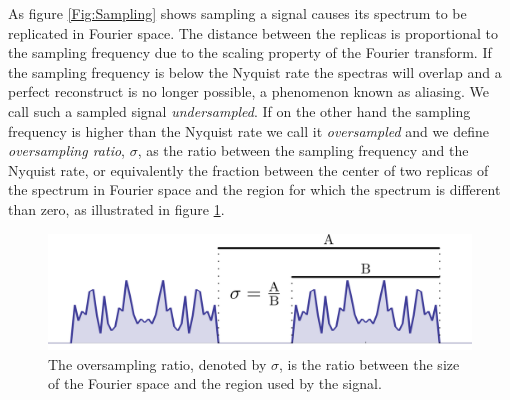 As figure \ref{Fig:Sampling} shows sampling a signal causes its spectrum to be
replicated in Fourier space. The distance between the replicas is proportional
to the sampling frequency due to the scaling property of the Fourier
transform. If the sampling frequency is below the Nyquist rate the spectras will
overlap and a perfect reconstruct is no longer possible, a phenomenon known as
aliasing. We call such a sampled signal {\em undersampled}. If on the other hand
the sampling frequency is higher than the Nyquist rate we call it {\em
  oversampled} and we define {\em oversampling ratio}, $\sigma$, as the ratio between the
sampling frequency and the Nyquist rate, or equivalently the fraction between
the center of two replicas of the spectrum in Fourier space and the region for
which the spectrum is different than zero, as illustrated in figure \ref{Fig:OversamplingRatio}.

\begin{figure}[h]
  \centering
  \includegraphics[width=0.8 \columnwidth]{Oversampling.png}
  \caption{The oversampling ratio, denoted by $\sigma$, is the ratio between the
    size of the Fourier space and the region used by the signal.}
  \label{Fig:OversamplingRatio}
\end{figure}
